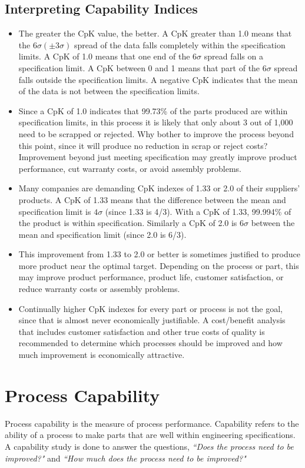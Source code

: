 \documentclass[]{report}
\begin{document}
\subsection{Interpreting Capability Indices}
\begin{itemize}
	\item The greater the CpK value, the better. A CpK greater than 1.0 means that the $6\sigma  (\pm 3\sigma)$ spread of the data falls completely within the specification limits. A CpK of 1.0 means that one end of the $6\sigma$ spread falls on a specification limit. A CpK between 0 and 1 means that part of the $6\sigma$  spread falls outside the specification limits. A negative CpK indicates that the mean of the data is not between the specification limits.
	
	\item Since a CpK of 1.0 indicates that 99.73\% of the parts produced are within specification limits, in this process it is likely that only about 3 out of 1,000 need to be scrapped or rejected. Why bother to improve the process beyond this point, since it will produce no reduction in scrap or reject costs? Improvement beyond just meeting specification may greatly improve product performance, cut warranty costs, or avoid assembly problems.
	
	\item
	Many companies are demanding CpK indexes of 1.33 or 2.0 of their suppliers’ products. A CpK of 1.33 means that the difference between the mean and specification limit is $4\sigma$  (since 1.33 is 4/3). With a CpK of 1.33, 99.994\% of the product is within specification. Similarly a CpK of 2.0 is $6\sigma$  between the mean and specification limit (since 2.0 is 6/3). 
	\item 
	This improvement from 1.33 to 2.0 or better is sometimes justified to produce more product near the optimal target. Depending on the process or part, this may improve product performance, product life, customer satisfaction, or reduce warranty costs or assembly problems.
	\item
	Continually higher CpK indexes for every part or process is not the goal, since that is almost never economically justifiable. A cost/benefit analysis that includes customer satisfaction and other true costs of quality is recommended to determine which processes should be improved and how much improvement is economically attractive.
\end{itemize}
\newpage
\section{Process Capability}
Process capability is the measure of process performance. Capability refers to the ability of a process to make parts that are well within engineering specifications. A capability study is done to answer the questions, \textit{``Does the process need to be improved?"} and  \textit{``How much does the process need to be improved?"}
\end{document}
